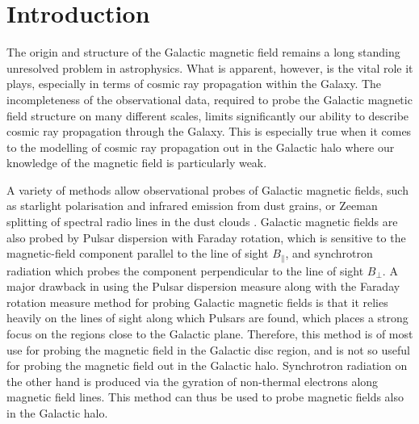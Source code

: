 \documentclass[12pt, a4 paper]{article}
\date{ }
\begin{document}

\tableofcontents
\newpage

\section{Introduction}
\label{Introducion}

The origin and structure of the Galactic magnetic field remains a long standing unresolved problem in astrophysics. What is apparent, however, is the vital role it plays, especially in terms of cosmic ray propagation within the Galaxy. The incompleteness of the observational data, required to probe the Galactic magnetic field structure on many different scales, limits significantly our ability to describe cosmic ray propagation through the Galaxy. This is especially true when it comes to the modelling of cosmic ray propagation out in the Galactic halo where our knowledge of the magnetic field is particularly weak.

A variety of methods allow observational probes of Galactic magnetic fields, such as starlight polarisation and infrared emission from dust grains, or Zeeman splitting of spectral radio lines in the dust clouds \textcolor{blue}{\cite{Beck_2007}}. Galactic magnetic fields are also probed by Pulsar dispersion with Faraday rotation, which is sensitive to the magnetic-field component parallel to the line of sight $B_{\parallel}$, and synchrotron radiation which probes the component perpendicular to the line of sight $B_{\perp}$. A major drawback in using the Pulsar dispersion measure along with the Faraday rotation measure method for probing Galactic magnetic fields is that it relies heavily on the lines of sight along which Pulsars are found, which places a strong focus on the regions close to the Galactic plane. Therefore, this method is of most use for probing the magnetic field in the Galactic disc region, and is not so useful for probing the magnetic field out in the Galactic halo. Synchrotron radiation on the other hand is produced via the gyration of non-thermal electrons along magnetic field lines. This method can thus be used to probe magnetic fields also in the Galactic halo.
\end{document}
